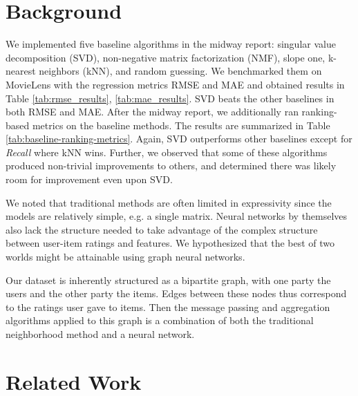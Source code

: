 \documentclass{article}
\begin{document}
\section{Background}


We implemented five baseline algorithms in the midway report: singular value decomposition (SVD), non-negative matrix factorization (NMF), slope one, k-nearest neighbors (kNN), and random guessing. We benchmarked them on MovieLens with the regression metrics RMSE and MAE and obtained results in Table \ref{tab:rmse_results}, \ref{tab:mae_results}. SVD beats the other baselines in both RMSE and MAE. After the midway report, we additionally ran ranking-based metrics on the baseline methods. The results are summarized in Table \ref{tab:baseline-ranking-metrics}. Again, SVD outperforms other baselines except for \textit{Recall} where kNN wins. Further, we observed that some of these algorithms produced non-trivial improvements to others, and determined there was likely room for improvement even upon SVD.

We noted that traditional methods are often limited in expressivity since the models are relatively simple, e.g. a single matrix. Neural networks by themselves also lack the structure needed to take advantage of the complex structure between user-item ratings and features. We hypothesized that the best of two worlds might be attainable using graph neural networks.

Our dataset is inherently structured as a bipartite graph, with one party the users and the other party the items. Edges between these nodes thus correspond to the ratings user gave to items. Then the message passing and aggregation algorithms applied to this graph is a combination of both the traditional neighborhood method and a neural network. 


\section{Related Work} 

\end{document}

